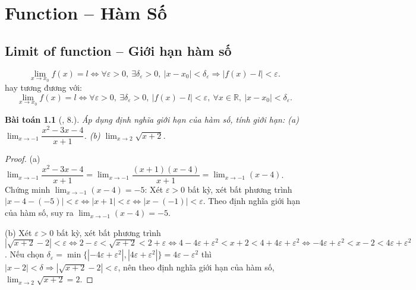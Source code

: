 \documentclass[oneside]{book}
\newtheorem{baitoan}{Bài toán}
\begin{document}

\chapter{Function -- Hàm Số}
\minitoc


\section{Limit of function -- Giới hạn hàm số}

\begin{equation*}
	\lim_{x\to x_0} f(x) = l\Leftrightarrow\forall\varepsilon > 0,\ \exists\delta_\varepsilon > 0,\ |x - x_0| < \delta_\varepsilon\Rightarrow|f(x) - l| < \varepsilon.
\end{equation*}
hay tương đương với:
\begin{equation*}
	\lim_{x\to x_0} f(x) = l\Leftrightarrow\forall\varepsilon > 0,\ \exists\delta_\varepsilon > 0,\ |f(x) - l| < \varepsilon,\ \forall x\in\mathbb{R},\ |x - x_0| < \delta_\varepsilon.
\end{equation*}

\begin{baitoan}[\cite{TLCT_dai_so_giai_tich_11}, 8.]
	Áp dụng định nghĩa giới hạn của hàm số, tính giới hạn: (a) $\lim_{x\to-1} \dfrac{x^2 - 3x - 4}{x + 1}$. (b) $\lim_{x\to2} \sqrt{x + 2}$.
\end{baitoan}

\begin{proof}
	(a) $\lim_{x\to-1} \dfrac{x^2 - 3x - 4}{x + 1} = \lim_{x\to-1} \dfrac{(x + 1)(x - 4)}{x + 1} = \lim_{x\to-1} (x - 4)$. Chứng minh $\lim_{x\to-1} (x - 4) = -5$: Xét $\varepsilon > 0$ bất kỳ, xét bất phương trình $|x - 4 - (-5)| < \varepsilon\Leftrightarrow|x + 1| < \varepsilon\Leftrightarrow|x - (-1)| < \varepsilon$. Theo định nghĩa giới hạn của hàm số, suy ra $\lim_{x\to-1} (x - 4) = -5$.
	
	\item(b)  Xét $\varepsilon > 0$ bất kỳ, xét bất phương trình $|\sqrt{x + 2} - 2| < \varepsilon\Leftrightarrow2 - \varepsilon < \sqrt{x + 2} < 2 + \varepsilon\Leftrightarrow4 - 4\varepsilon + \varepsilon^2 < x + 2 < 4 + 4\varepsilon + \varepsilon^2\Leftrightarrow-4\varepsilon + \varepsilon^2 < x - 2 < 4\varepsilon + \varepsilon^2$. Nếu chọn $\delta_\varepsilon = \min\{|-4\varepsilon + \varepsilon^2|,|4\varepsilon + \varepsilon^2|\} = 4\varepsilon - \varepsilon^2$ thì $|x - 2| < \delta\Rightarrow|\sqrt{x + 2} - 2| < \varepsilon$, nên theo định nghĩa giới hạn của hàm số, $\lim_{x\to2} \sqrt{x + 2} = 2$.
\end{proof}
\end{document}
